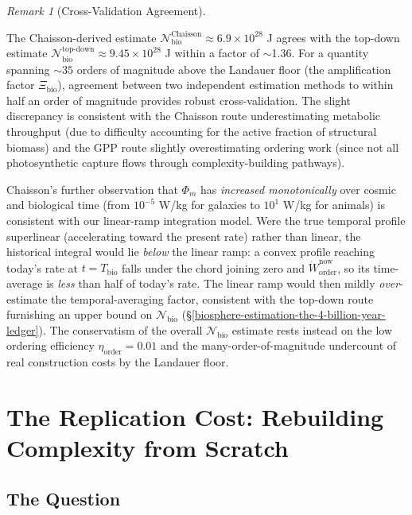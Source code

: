 \documentclass[11pt]{article}
\theoremstyle{plain}
\theoremstyle{definition}
\theoremstyle{remark}
\newtheorem{remark}{Remark}
\let\origsection\section
\renewcommand{\section}{\needspace{12\baselineskip}\origsection}
\let\origsubsection\subsection
\renewcommand{\subsection}{\needspace{7\baselineskip}\origsubsection}
\begin{document}
\begin{remark}[Cross-Validation Agreement]
\label{rem-chaisson-cross-validation}

The Chaisson-derived estimate $\mathcal{N}_{\text{bio}}^{\text{Chaisson}} \approx 6.9 \times 10^{28}$ J agrees with the top-down estimate $\mathcal{N}_{\text{bio}}^{\text{top-down}} \approx 9.45 \times 10^{28}$ J within a factor of $\sim$1.36. For a quantity spanning $\sim 35$ orders of magnitude above the Landauer floor (the amplification factor $\Xi_{\text{bio}}$), agreement between two independent estimation methods to within half an order of magnitude provides robust cross-validation. The slight discrepancy is consistent with the Chaisson route underestimating metabolic throughput (due to difficulty accounting for the active fraction of structural biomass) and the GPP route slightly overestimating ordering work (since not all photosynthetic capture flows through complexity-building pathways).
\end{remark}

Chaisson's further observation that \(\Phi_m\) has \emph{increased
monotonically} over cosmic and biological time (from \(10^{-5}\) W/kg
for galaxies to \(10^{1}\) W/kg for animals) is consistent with our
linear-ramp integration model. Were the true temporal profile
superlinear (accelerating toward the present rate) rather than linear,
the historical integral would lie \emph{below} the linear ramp: a convex
profile reaching today's rate at \(t = T_{\text{bio}}\) falls under the
chord joining zero and \(\dot{W}_{\text{order}}^{\text{now}}\), so its
time-average is \emph{less} than half of today's rate. The linear ramp
would then mildly \emph{over}-estimate the temporal-averaging factor,
consistent with the top-down route furnishing an upper bound on
\(\mathcal{N}_{\text{bio}}\)
(§\ref{biosphere-estimation-the-4-billion-year-ledger}). The
conservatism of the overall \(\mathcal{N}_{\text{bio}}\) estimate rests
instead on the low ordering efficiency \(\eta_{\text{order}} = 0.01\)
and the many-order-of-magnitude undercount of real construction costs by
the Landauer floor.

\section{The Replication Cost: Rebuilding Complexity from
Scratch}\label{the-replication-cost-rebuilding-complexity-from-scratch}

\subsection{The Question}\label{the-question}
\end{document}
